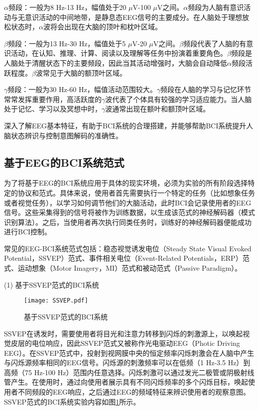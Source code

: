 $\alpha$频段：一般为8 Hz-13 Hz，幅值处于20 $\mu $V-100 $\mu $V之间。$\alpha$频段为人脑有意识活动与无意识活动的中间地带，是静息态EEG信号的主要成分。在人脑处于理想放松状态时，$\alpha$波将会出现在大脑的顶叶和枕叶区域。

$\beta$频段：一般为13 Hz-30 Hz，幅值处于5 $\mu $V-20 $\mu $V之间。$\beta$频段代表了人脑的有意识活动，在认知、推理、计算、阅读以及理解等任务中扮演着重要角色。$\beta$频段是人脑处于清醒状态下的主要频段，因此当其活动增强时，大脑会自动降低$\alpha$频段活跃程度。$\beta$波常见于大脑的额顶叶区域。

$\gamma$频段：一般为30 Hz-60 Hz，幅值活动范围较大。$\gamma$频段在人脑的学习与记忆环节常常发挥重要作用，高活跃度的$\gamma$波代表了个体具有较强的学习适应能力。当人脑处于记忆、学习以及冥想中时，$\gamma$波通常出现在额叶和额顶叶区域。

深入了解EEG基本特征，有助于BCI系统的合理搭建，并能够帮助BCI系统提升人脑状态辨识与控制意图解码的准确性。


\subsection{基于EEG的BCI系统范式}
为了将基于EEG的BCI系统应用于具体的现实环境，必须为实验的所有阶段选择特定的协议和范式。具体来说，使用者首先需要执行一个特定的任务（比如想象任务或者视觉任务），以学习如何调节他们的大脑活动，此时BCI会记录使用者的EEG信号。这些采集得到的信号将被作为训练数据，以生成该范式的神经解码器（模式识别算法）。之后，当使用者再次执行同类任务时，训练好的神经解码器便能成功进行BCI控制。

常见的EEG-BCI系统范式包括：稳态视觉诱发电位（Steady State Visual Evoked Potential，SSVEP）范式\cite{1-29,1-30}、事件相关电位（Event-Related Potentials，ERP）范式\cite{1-31,1-32}、运动想象（Motor Imagery，MI）范式\cite{1-33,1-34}和被动范式（Passive Paradigm）\cite{1-35}。
 
(1) 基于SSVEP范式的BCI系统

\begin{figure}[!h]
	\centering
	\texttt{[image: SSVEP.pdf]}
	\caption{基于SSVEP范式的BCI系统}
	\label{fig1-3}
\end{figure}

SSVEP在诱发时，需要使用者将目光和注意力转移到闪烁的刺激源上，以唤起视觉皮层的电位响应，因此SSVEP范式又被称作光电驱动EEG（Photic Driving EEG）。在SSVEP范式中，投射到视网膜中央的恒定频率闪烁刺激会在人脑中产生与闪烁源频率相同的EEG信号。闪烁源的刺激频率可以在低频（1 Hz-3.5 Hz）到高频（75 Hz-100 Hz）范围内任意选择\cite{1-37}。闪烁刺激可以通过发光二极管或阴极射线管产生。在使用时，通过向使用者展示具有不同闪烁频率的多个闪烁目标，唤起使用者不同频段的EEG响应，之后通过EEG的频域特征来辨识使用者的观察意图。SSVEP范式的BCI系统实验内容如图\ref{fig1-3}所示。

